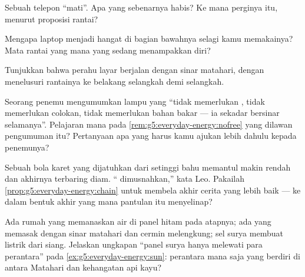 \begin{exercise}[$\star$]\label{exo:g5:everyday-energy:6}
Sebuah telepon ``mati''. Apa yang sebenarnya habis? Ke mana perginya
 itu, menurut proposisi rantai?
\end{exercise}

\begin{exercise}[$\star$]\label{exo:g5:everyday-energy:7}
Mengapa laptop menjadi hangat di bagian bawahnya selagi kamu
memakainya? Mata rantai yang mana yang sedang menampakkan diri?
\end{exercise}

\begin{exercise}[$\star$]\label{exo:g5:everyday-energy:8}
Tunjukkan bahwa perahu layar berjalan dengan sinar matahari, dengan
menelusuri rantainya ke belakang selangkah demi selangkah.
\end{exercise}

\begin{exercise}[$\star\star$]\label{exo:g5:everyday-energy:9}
Seorang penemu mengumumkan lampu yang ``tidak memerlukan ,
tidak memerlukan colokan, tidak memerlukan bahan bakar --- ia sekadar
bersinar selamanya''. Pelajaran mana pada
\cref{rem:g5:everyday-energy:nofree} yang dilawan pengumuman itu?
Pertanyaan apa yang harus kamu ajukan lebih dahulu kepada penemunya?
\end{exercise}

\begin{exercise}[$\star\star$]\label{exo:g5:everyday-energy:10}
Sebuah bola karet yang dijatuhkan dari setinggi bahu memantul makin
rendah dan akhirnya terbaring diam. `` dimusnahkan,'' kata
Leo. Pakailah \cref{prop:g5:everyday-energy:chain} untuk membela akhir
cerita yang lebih baik --- ke dalam bentuk akhir yang mana 
pantulan itu menyelinap?
\end{exercise}

\begin{exercise}[$\star\star$]\label{exo:g5:everyday-energy:11}
Ada rumah yang memanaskan air di panel hitam pada atapnya; ada yang
memasak dengan sinar matahari dan cermin melengkung; sel surya membuat
listrik dari  siang. Jelaskan ungkapan ``panel surya hanya
melewati para perantara'' pada \cref{ex:g5:everyday-energy:sun}:
perantara mana saja yang berdiri di antara Matahari dan kehangatan api
kayu?
\end{exercise}

